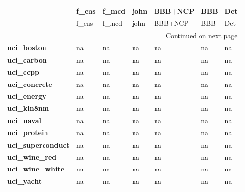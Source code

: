 \begin{longtable}[l]{lllllll}
\toprule
{} & f\_ens & f\_mcd & john & BBB+NCP & BBB & Det \\
\midrule
\endfirsthead

\toprule
{} & f\_ens & f\_mcd & john & BBB+NCP & BBB & Det \\
\midrule
\endhead
\midrule
\multicolumn{7}{r}{{Continued on next page}} \\
\midrule
\endfoot

\bottomrule
\endlastfoot
\textbf{uci\_boston      } &    na &    na &   na &      na &  na &  na \\
\textbf{uci\_carbon      } &    na &    na &   na &      na &  na &  na \\
\textbf{uci\_ccpp        } &    na &    na &   na &      na &  na &  na \\
\textbf{uci\_concrete    } &    na &    na &   na &      na &  na &  na \\
\textbf{uci\_energy      } &    na &    na &   na &      na &  na &  na \\
\textbf{uci\_kin8nm      } &    na &    na &   na &      na &  na &  na \\
\textbf{uci\_naval       } &    na &    na &   na &      na &  na &  na \\
\textbf{uci\_protein     } &    na &    na &   na &      na &  na &  na \\
\textbf{uci\_superconduct} &    na &    na &   na &      na &  na &  na \\
\textbf{uci\_wine\_red    } &    na &    na &   na &      na &  na &  na \\
\textbf{uci\_wine\_white  } &    na &    na &   na &      na &  na &  na \\
\textbf{uci\_yacht       } &    na &    na &   na &      na &  na &  na \\
\end{longtable}
